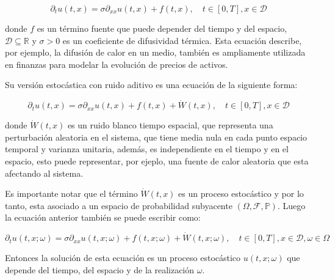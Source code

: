 \[
  \partial_t u(t,x) = \sigma\partial_{xx} u(t,x) + f(t,x), \quad t \in [0,T], x \in \mathcal{D}
\]

donde $f$ es un término fuente que puede depender del tiempo y del espacio, $\mathcal{D} \subseteq \mathbb{R}$ y $\sigma >0$ es un coeficiente de difusividad térmica. Esta ecuación describe, por ejemplo, la difusión de calor en un medio, también es ampliamente utilizada en finanzas para modelar la evolución de precios de activos.

Su versión estocástica con ruido aditivo es una ecuación de la siguiente forma:

\[
  \partial_t u(t,x) = \sigma\partial_{xx} u(t,x) + f(t,x) + \dot{W}(t,x), \quad t \in [0,T], x \in \mathcal{D}
\]

donde $\dot{W}(t,x)$ es un ruido blanco tiempo espacial, que representa una perturbación aleatoria en el sistema, que tiene media nula en cada punto espacio temporal y varianza unitaria, además, es independiente en el tiempo y en el espacio, esto puede representar, por ejeplo, una fuente de calor aleatoria que esta afectando al sistema.

Es importante notar que el término $\dot{W}(t,x)$ es un proceso estocástico y por lo tanto, esta asociado a un espacio de probabilidad subyacente $(\Omega, \mathcal{F}, \mathbb{P})$. Luego la ecuación anterior también se puede escribir como:

\[
  \partial_t u(t,x ;\omega) = \sigma\partial_{xx} u(t,x ; \omega) + f(t,x ; \omega) + \dot{W}(t,x ; \omega), \quad t \in [0,T], x \in \mathcal{D}, \omega \in \Omega
\]

Entonces la solución de esta ecuación es un proceso estocástico $u(t,x ; \omega)$ que depende del tiempo, del espacio y de la realización $\omega$.
